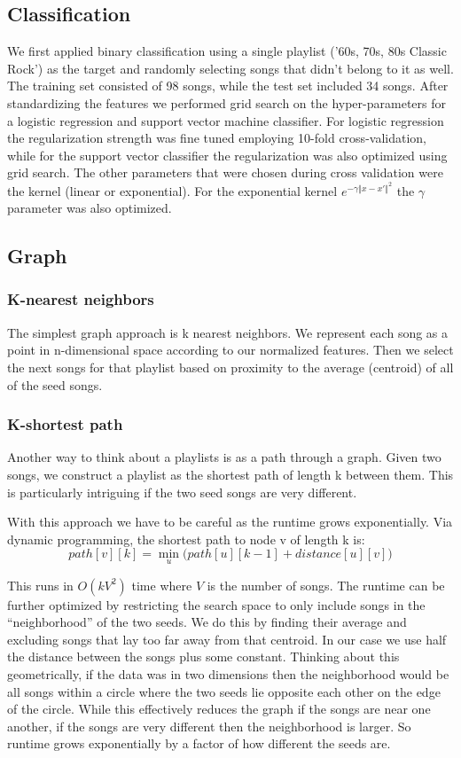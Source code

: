 \documentclass[acmtog]{acmart}
\begin{document}
\subsection{Classification}

We first applied binary classification using a single playlist ('60s, 70s, 80s Classic Rock') as the target and randomly selecting songs that didn't belong to it as well. The training set consisted of 98 songs, while the test set included 34 songs. After standardizing the features we performed grid search on the hyper-parameters for a logistic regression and support vector machine classifier. For logistic regression the regularization strength was fine tuned employing 10-fold cross-validation, while for the support vector classifier the regularization was also optimized using grid search. The other parameters that were chosen during cross validation were the kernel (linear or exponential). For the exponential kernel $e^{-\gamma {\Vert x -x' \Vert}^{2}}$ the $\gamma$ parameter was also optimized.

\subsection{Graph}

\subsubsection{K-nearest neighbors}
The simplest graph approach is k nearest neighbors. We represent each song as a point in n-dimensional space according to our normalized features. Then we select the next songs for that playlist based on proximity to the average (centroid) of all of the seed songs.

\subsubsection{K-shortest path}

Another way to think about a playlists is as a path through a graph. Given two songs, we construct a playlist as the shortest path of length k between them. This is particularly intriguing if the two seed songs are very different.

With this approach we have to be careful as the runtime grows exponentially. Via dynamic programming, the shortest path to node v of length k is:
\[
  path[v][k] = \min_u \Big ( path[u][k-1] + distance[u][v] \Big)
\]

This runs in $O(kV^2)$ time where $V$ is the number of songs. The runtime can be further optimized by restricting the search space to only include songs in the ``neighborhood'' of the two seeds. We do this by finding their average and excluding songs that lay too far away from that centroid. In our case we use half the distance between the songs plus some constant. Thinking about this geometrically, if the data was in two dimensions then the neighborhood would be all songs within a circle where the two seeds lie opposite each other on the edge of the circle. While this effectively reduces the graph if the songs are near one another, if the songs are very different then the neighborhood is larger. So runtime grows exponentially by a factor of how different the seeds are.
\end{document}
